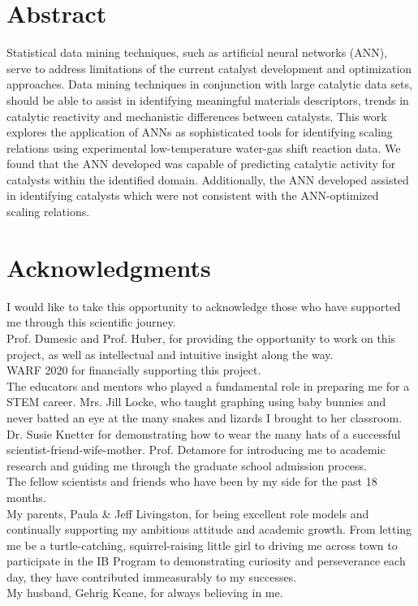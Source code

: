 \documentclass[twoside,12pt]{book}
\begin{document}
\frontmatter
\tableofcontents
\listoffigures
\listoftables

\chapter{Abstract}
Statistical data mining techniques, such as artificial neural networks (ANN), serve to address limitations of the current catalyst development and optimization approaches. Data mining techniques in conjunction with large catalytic data sets, should be able to assist in identifying meaningful materials descriptors, trends in catalytic reactivity and mechanistic differences between catalysts. This work explores the application of ANNs as sophisticated tools for identifying scaling relations using experimental low-temperature water-gas shift reaction data. We found that the ANN developed was capable of predicting catalytic activity for catalysts within the identified domain. Additionally, the ANN developed assisted in identifying catalysts which were not consistent with the ANN-optimized scaling relations.


\chapter{Acknowledgments}
I would like to take this opportunity to acknowledge those who have supported me through this scientific journey.\\
Prof. Dumesic and Prof. Huber, for providing the opportunity to work on this project, as well as intellectual and intuitive insight along the way.\\
WARF 2020 for financially supporting this project. \\
The educators and mentors who played a fundamental role in preparing me for a STEM career. Mrs. Jill Locke, who taught graphing using baby bunnies and never batted an eye at the many snakes and lizards I brought to her classroom. Dr. Susie Knetter for demonstrating how to wear the many hats of a successful scientist-friend-wife-mother. Prof. Detamore for introducing me to academic research and guiding me through the graduate school admission process. \\
The fellow scientists and friends who have been by my side for the past 18 months.\\
My parents, Paula \& Jeff Livingston, for being excellent role models and continually supporting my ambitious attitude and academic growth. From letting me be a turtle-catching, squirrel-raising little girl to driving me across town to participate in the IB Program to demonstrating curiosity and perseverance each day, they have contributed immeasurably to my successes. \\
My husband, Gehrig Keane, for always believing in me. 


\mainmatter






\appendix
% 



\printbibliography
\end{document}
